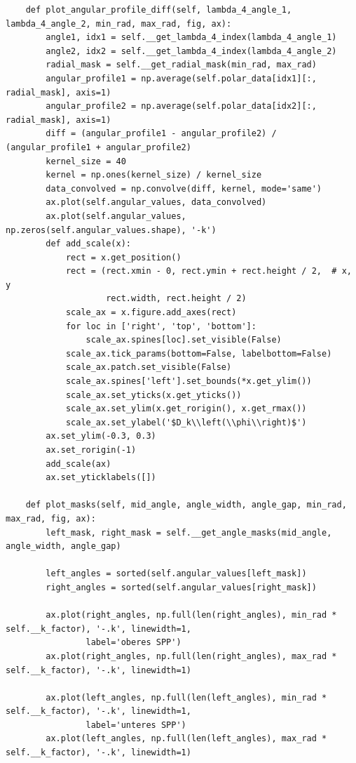 \documentclass[a4paper, titlepage,  ngerman]{book}
\begin{document}
\begin{verbatim}
    def plot_angular_profile_diff(self, lambda_4_angle_1, lambda_4_angle_2, min_rad, max_rad, fig, ax):
        angle1, idx1 = self.__get_lambda_4_index(lambda_4_angle_1)
        angle2, idx2 = self.__get_lambda_4_index(lambda_4_angle_2)
        radial_mask = self.__get_radial_mask(min_rad, max_rad)
        angular_profile1 = np.average(self.polar_data[idx1][:, radial_mask], axis=1)
        angular_profile2 = np.average(self.polar_data[idx2][:, radial_mask], axis=1)
        diff = (angular_profile1 - angular_profile2) / (angular_profile1 + angular_profile2)
        kernel_size = 40
        kernel = np.ones(kernel_size) / kernel_size
        data_convolved = np.convolve(diff, kernel, mode='same')
        ax.plot(self.angular_values, data_convolved)
        ax.plot(self.angular_values, np.zeros(self.angular_values.shape), '-k')
        def add_scale(x):
            rect = x.get_position()
            rect = (rect.xmin - 0, rect.ymin + rect.height / 2,  # x, y
                    rect.width, rect.height / 2)
            scale_ax = x.figure.add_axes(rect)
            for loc in ['right', 'top', 'bottom']:
                scale_ax.spines[loc].set_visible(False)
            scale_ax.tick_params(bottom=False, labelbottom=False)
            scale_ax.patch.set_visible(False)
            scale_ax.spines['left'].set_bounds(*x.get_ylim())
            scale_ax.set_yticks(x.get_yticks())
            scale_ax.set_ylim(x.get_rorigin(), x.get_rmax())
            scale_ax.set_ylabel('$D_k\\left(\\phi\\right)$')
        ax.set_ylim(-0.3, 0.3)
        ax.set_rorigin(-1)
        add_scale(ax)
        ax.set_yticklabels([])

    def plot_masks(self, mid_angle, angle_width, angle_gap, min_rad, max_rad, fig, ax):
        left_mask, right_mask = self.__get_angle_masks(mid_angle, angle_width, angle_gap)

        left_angles = sorted(self.angular_values[left_mask])
        right_angles = sorted(self.angular_values[right_mask])

        ax.plot(right_angles, np.full(len(right_angles), min_rad * self.__k_factor), '-.k', linewidth=1,
                label='oberes SPP')
        ax.plot(right_angles, np.full(len(right_angles), max_rad * self.__k_factor), '-.k', linewidth=1)

        ax.plot(left_angles, np.full(len(left_angles), min_rad * self.__k_factor), '-.k', linewidth=1,
                label='unteres SPP')
        ax.plot(left_angles, np.full(len(left_angles), max_rad * self.__k_factor), '-.k', linewidth=1)


\end{verbatim}
\end{document}
